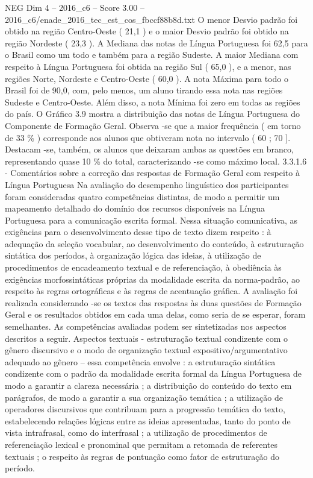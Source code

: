 \begin{textsample}{NEG Dim 4 – 2016\_c6 – Score 3.00 – 2016\_c6/enade\_2016\_tec\_est\_cos\_fbccf88b8d.txt}
O menor Desvio padrão foi obtido na região Centro-Oeste ( 21,1 ) e o maior Desvio padrão foi obtido na região Nordeste ( 23,3 ).
A Mediana das notas de Língua Portuguesa foi 62,5 para o Brasil como um todo e também para a região Sudeste.
A maior Mediana com respeito à Língua Portuguesa foi obtida na região Sul ( 65,0 ), e a menor, nas regiões Norte, Nordeste e Centro-Oeste ( 60,0 ).
A nota Máxima para todo o Brasil foi de 90,0, com, pelo menos, um aluno tirando essa nota nas regiões Sudeste e Centro-Oeste.
Além disso, a nota Mínima foi zero em todas as regiões do país.
O Gráfico 3.9 mostra a distribuição das notas de Língua Portuguesa do Componente de Formação Geral.
Observa -se que a maior frequência ( em torno de 33 \% ) corresponde aos alunos que obtiveram nota no intervalo ( 60 ; 70 ].
Destacam -se, também, os alunos que deixaram ambas as questões em branco, representando quase 10 \% do total, caracterizando -se como máximo local. 3.3.1.6 - Comentários sobre a correção das respostas de Formação Geral com respeito à Língua Portuguesa Na avaliação do desempenho linguístico dos participantes foram consideradas quatro competências distintas, de modo a permitir um mapeamento detalhado do domínio dos recursos disponíveis na Língua Portuguesa para a comunicação escrita formal.
Nessa situação comunicativa, as exigências para o desenvolvimento desse tipo de texto dizem respeito : à adequação da seleção vocabular, ao desenvolvimento do conteúdo, à estruturação sintática dos períodos, à organização lógica das ideias, à utilização de procedimentos de encadeamento textual e de referenciação, à obediência às exigências morfossintáticas próprias da modalidade escrita da norma-padrão, ao respeito às regras ortográficas e às regras de acentuação gráfica.
A avaliação foi realizada considerando -se os textos das respostas às duas questões de Formação Geral e os resultados obtidos em cada uma delas, como seria de se esperar, foram semelhantes.
As competências avaliadas podem ser sintetizadas nos aspectos descritos a seguir.
Aspectos textuais - estruturação textual condizente com o gênero discursivo e o modo de organização textual expositivo/argumentativo adequado ao gênero – essa competência envolve : a estruturação sintática condizente com o padrão da modalidade escrita formal da Língua Portuguesa de modo a garantir a clareza necessária ; a distribuição do conteúdo do texto em parágrafos, de modo a garantir a sua organização temática ; a utilização de operadores discursivos que contribuam para a progressão temática do texto, estabelecendo relações lógicas entre as ideias apresentadas, tanto do ponto de vista intrafrasal, como do interfrasal ; a utilização de procedimentos de referenciação lexical e pronominal que permitam a retomada de referentes textuais ; o respeito às regras de pontuação como fator de estruturação do período.

\end{textsample}
